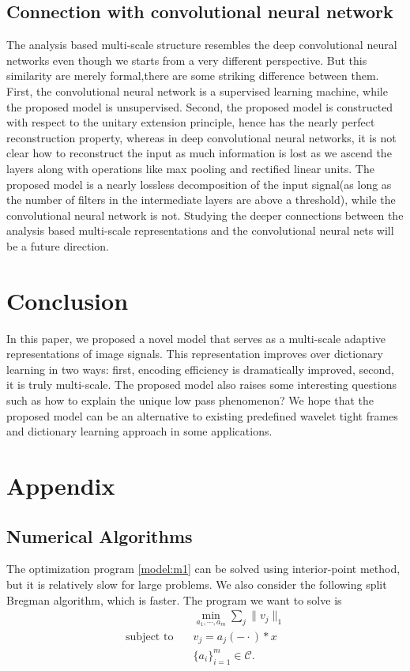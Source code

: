 \documentclass[a4paper]{article}
\begin{document}
\subsection{Connection with convolutional neural network}
The analysis based multi-scale structure resembles the deep convolutional neural networks even though we starts from a very different perspective. But this similarity are merely formal,there are some striking difference between them. First, the convolutional neural network is a supervised learning machine, while the proposed model is unsupervised. Second, the proposed model is constructed with respect to the unitary extension principle, hence has the nearly perfect reconstruction property, whereas in deep convolutional neural networks, it is not clear how to reconstruct the input as much information is lost as we ascend the layers along with operations like max pooling and rectified linear units. The proposed model is a nearly lossless decomposition of the input signal(as long as the number of filters in the intermediate layers are above a threshold), while the convolutional neural network is not. Studying the deeper connections between the analysis based multi-scale representations and the convolutional neural nets will be a future direction.

\section{Conclusion}
In this paper, we proposed a novel model that serves as a multi-scale adaptive representations of image signals. This representation improves over dictionary learning in two ways: first, encoding efficiency is dramatically improved, second, it is truly multi-scale. The proposed model also raises some interesting questions such as how to explain the unique low pass phenomenon? We hope that the proposed model can be an alternative to existing predefined wavelet tight frames and dictionary learning approach in some applications.
\section{Appendix}
\subsection{Numerical Algorithms}

The optimization program \eqref{model:m1} can be solved using interior-point method, but it is relatively slow  for large problems. We also consider the following split Bregman algorithm, which is faster. The program we want to solve is 
\begin{equation}
\begin{aligned}
&\min_{a_1,\cdots,a_m} \sum_j \|v_j\|_1 \\
\textrm{subject to} \quad & v_j = a_j(-\cdot)*x \\
	& \{a_i\}_{i=1}^m \in \mathcal{C}.
	\end{aligned}
\end{equation}
\end{document}
